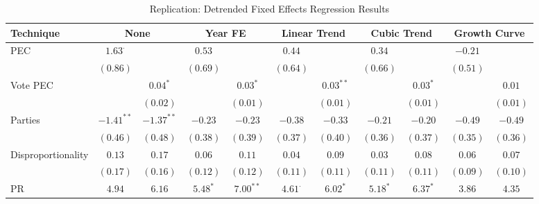 \begin{sidewaystable}
\caption{Replication: Detrended Fixed Effects Regression Results}
\label{table:ReplicationResults}
\begin{center}
\begin{tabular}{l c c c c c c c c c c }
\toprule
Technique & \multicolumn{2}{c}{None} & \multicolumn{2}{c}{Year FE} & \multicolumn{2}{c}{Linear Trend} & \multicolumn{2}{c}{Cubic Trend} & \multicolumn{2}{c}{Growth Curve} \\
\midrule
PEC                            & $1.63^{\cdot}$  &                 & $0.53$       &               & $0.44$         &                & $0.34$         &                & $-0.21$         &                 \\
                               & $(0.86)$        &                 & $(0.69)$     &               & $(0.64)$       &                & $(0.66)$       &                & $(0.51)$        &                 \\
Vote PEC                       &                 & $0.04^{*}$      &              & $0.03^{*}$    &                & $0.03^{**}$    &                & $0.03^{*}$     &                 & $0.01$          \\
                               &                 & $(0.02)$        &              & $(0.01)$      &                & $(0.01)$       &                & $(0.01)$       &                 & $(0.01)$        \\
Parties                        & $-1.41^{**}$    & $-1.37^{**}$    & $-0.23$      & $-0.23$       & $-0.38$        & $-0.33$        & $-0.21$        & $-0.20$        & $-0.49$         & $-0.49$         \\
                               & $(0.46)$        & $(0.48)$        & $(0.38)$     & $(0.39)$      & $(0.37)$       & $(0.40)$       & $(0.36)$       & $(0.37)$       & $(0.35)$        & $(0.36)$        \\
Disproportionality             & $0.13$          & $0.17$          & $0.06$       & $0.11$        & $0.04$         & $0.09$         & $0.03$         & $0.08$         & $0.06$          & $0.07$          \\
                               & $(0.17)$        & $(0.16)$        & $(0.12)$     & $(0.12)$      & $(0.11)$       & $(0.11)$       & $(0.11)$       & $(0.11)$       & $(0.09)$        & $(0.10)$        \\
PR                             & $4.94$          & $6.16$          & $5.48^{*}$   & $7.00^{**}$   & $4.61^{\cdot}$ & $6.02^{*}$     & $5.18^{*}$     & $6.37^{*}$     & $3.86$          & $4.35$          \\

\end{tabular}
\end{center}
\end{sidewaystable}
